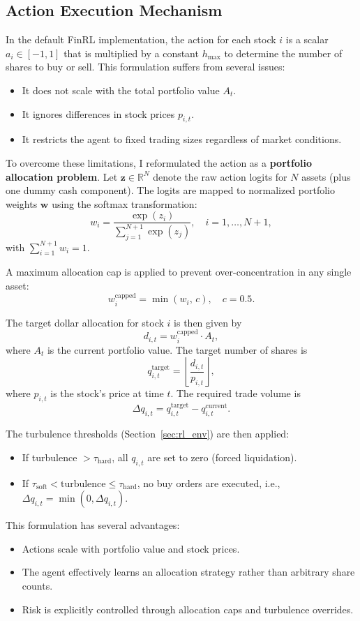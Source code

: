 \documentclass[12pt,a4paper]{report}
\begin{document}
\subsection{Action Execution Mechanism}
In the default FinRL implementation, the action for each stock $i$ is a scalar $a_i \in [-1,1]$ that is multiplied by a constant $h_{\max}$ to determine the number of shares to buy or sell. This formulation suffers from several issues:
\begin{itemize}
    \item It does not scale with the total portfolio value $A_t$.
    \item It ignores differences in stock prices $p_{i,t}$.
    \item It restricts the agent to fixed trading sizes regardless of market conditions.
\end{itemize}

To overcome these limitations, I reformulated the action as a \textbf{portfolio allocation problem}. Let $\mathbf{z} \in \mathbb{R}^N$ denote the raw action logits for $N$ assets (plus one dummy cash component). The logits are mapped to normalized portfolio weights $\mathbf{w}$ using the softmax transformation:
\[
w_i = \frac{\exp(z_i)}{\sum_{j=1}^{N+1} \exp(z_j)}, \quad i=1,\dots,N+1,
\]
with $\sum_{i=1}^{N+1} w_i = 1$.

A maximum allocation cap is applied to prevent over-concentration in any single asset:
\[
w_i^{\text{capped}} = \min(w_i, \, c), \quad c=0.5.
\]

The target dollar allocation for stock $i$ is then given by
\[
d_{i,t} = w_i^{\text{capped}} \cdot A_t,
\]
where $A_t$ is the current portfolio value. The target number of shares is
\[
q_{i,t}^{\text{target}} = \left\lfloor \frac{d_{i,t}}{p_{i,t}} \right\rfloor,
\]
where $p_{i,t}$ is the stock’s price at time $t$. The required trade volume is
\[
\Delta q_{i,t} = q_{i,t}^{\text{target}} - q_{i,t}^{\text{current}}.
\]

The turbulence thresholds (Section~\ref{sec:rl_env}) are then applied:
\begin{itemize}
    \item If turbulence $> \tau_{\text{hard}}$, all $q_{i,t}$ are set to zero (forced liquidation).
    \item If $\tau_{\text{soft}} < \text{turbulence} \leq \tau_{\text{hard}}$, no buy orders are executed, i.e., $\Delta q_{i,t} = \min(0, \Delta q_{i,t})$.
\end{itemize}

This formulation has several advantages:
\begin{itemize}
    \item Actions scale with portfolio value and stock prices.
    \item The agent effectively learns an allocation strategy rather than arbitrary share counts.
    \item Risk is explicitly controlled through allocation caps and turbulence overrides.
\end{itemize}
\end{document}
